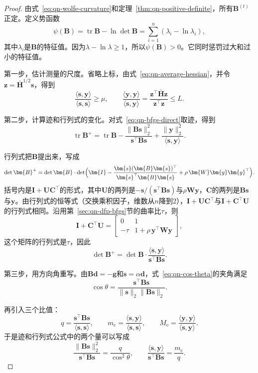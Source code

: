 \begin{proof}
由式~\eqref{eq:qn-wolfe-curvature}和定理~\ref{thm:qn-positive-definite}，所有$\bm{B}^{(t)}$正定。定义势函数
\[
 \psi(\bm{B})=\operatorname{tr}\bm{B}-\ln\det\bm{B}=\sum_{i=1}^n(\lambda_i-\ln\lambda_i),
\]
其中$\lambda_i$是$\bm{B}$的特征值。因为$\lambda-\ln\lambda\geq1$，所以$\psi(\bm{B})>0$。它同时惩罚过大和过小的特征值。

第一步，估计测量的尺度。省略上标，由式~\eqref{eq:qn-average-hessian}，并令$\bm{z}=\bar{\bm{H}}^{1/2}\bm{s}$，得到
\[
 \frac{\langle\bm{s},\bm{y}\rangle}{\langle\bm{s},\bm{s}\rangle}\geq\mu,\qquad
 \frac{\langle\bm{y},\bm{y}\rangle}{\langle\bm{s},\bm{y}\rangle}=\frac{\bm{z}^\top\bar{\bm{H}}\bm{z}}{\bm{z}^\top\bm{z}}\leq L.
\]

第二步，计算迹和行列式的变化。对式~\eqref{eq:qn-bfgs-direct}取迹，得到
\[
 \operatorname{tr}\bm{B}^{+}=\operatorname{tr}\bm{B}-\frac{\lVert\bm{B}\bm{s}\rVert_2^2}{\bm{s}^\top\bm{B}\bm{s}}+\frac{\lVert\bm{y}\rVert_2^2}{\langle\bm{s},\bm{y}\rangle}.
\]

行列式把$\bm{B}$提出来，写成
\[
 \det\bm{B}^{+}=\det\bm{B}\cdot\det\Bigl(\bm{I}-\frac{\bm{s}(\bm{B}\bm{s})^\top}{\bm{s}^\top\bm{B}\bm{s}}+\rho\,\bm{W}\bm{y}\bm{y}^\top\Bigr).
\]
括号内是$\bm{I}+\bm{U}\bm{C}^\top$的形式，其中$\bm{U}$的两列是$-\bm{s}/(\bm{s}^\top\bm{B}\bm{s})$与$\rho\bm{W}\bm{y}$，$\bm{C}$的两列是$\bm{B}\bm{s}$与$\bm{y}$。由行列式的恒等式（交换乘积因子，维数从$n$降到$2$），$\bm{I}+\bm{U}\bm{C}^\top$与$\bm{I}+\bm{C}^\top\bm{U}$的行列式相同。沿用第~\ref{sec:qn-dfp-bfgs}节的曲率比$\tau$，则
\[
 \bm{I}+\bm{C}^\top\bm{U}=\begin{bmatrix}0&1\\-\tau&1+\rho\,\bm{y}^\top\bm{W}\bm{y}\end{bmatrix},
\]
这个矩阵的行列式是$\tau$，因此
\[
 \det\bm{B}^{+}=\det\bm{B}\cdot\frac{\langle\bm{s},\bm{y}\rangle}{\bm{s}^\top\bm{B}\bm{s}}.
\]

第三步，用方向角重写。由$\bm{B}\bm{d}=-\bm{g}$和$\bm{s}=\alpha\bm{d}$，式~\eqref{eq:qn-cos-theta}的夹角满足
\[
 \cos\theta=\frac{\bm{s}^\top\bm{B}\bm{s}}{\lVert\bm{s}\rVert_2\lVert\bm{B}\bm{s}\rVert_2}.
\]

再引入三个比值：
\[
 q=\frac{\bm{s}^\top\bm{B}\bm{s}}{\langle\bm{s},\bm{s}\rangle},\qquad m_{\mathrm{c}}=\frac{\langle\bm{s},\bm{y}\rangle}{\langle\bm{s},\bm{s}\rangle},\qquad M_{\mathrm{c}}=\frac{\langle\bm{y},\bm{y}\rangle}{\langle\bm{s},\bm{y}\rangle}.
\]
于是迹和行列式公式中的两个量可以写成
\[
 \frac{\lVert\bm{B}\bm{s}\rVert_2^2}{\bm{s}^\top\bm{B}\bm{s}}=\frac{q}{\cos^2\theta},\qquad
 \frac{\langle\bm{s},\bm{y}\rangle}{\bm{s}^\top\bm{B}\bm{s}}=\frac{m_{\mathrm{c}}}{q}.
\]


\end{proof}
